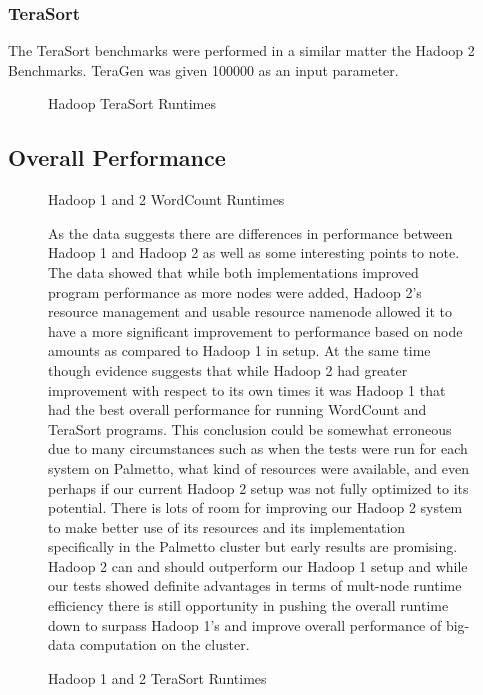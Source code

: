 \documentclass[conference]{IEEEtran}
\begin{document}
					\subsubsection{TeraSort}
						The TeraSort benchmarks were performed in a similar matter the Hadoop 2 Benchmarks. TeraGen was given 100000 as an input parameter.
						\begin{figure}[h]
                   					\begin{center}
                        						\caption{Hadoop TeraSort Runtimes}
                    				\end{center}
                  			\end{figure}
				\subsection{Overall Performance}
						\begin{figure}[h]
                   					\begin{center}
                       						
                        						\caption{Hadoop 1 and 2 WordCount Runtimes}
                    					\end{center}
						\end{figure}
						\begin{figure}[h]
                   					\begin{center}
                        					\caption{Hadoop 1 and 2 TeraSort Runtimes}
                    				\end{center}

						As the data suggests there are differences in performance between Hadoop 1 and Hadoop 2 as well as some interesting points to note. The data showed that while both implementations improved program performance as more nodes were added, Hadoop 2’s resource management and usable resource namenode allowed it to have a more significant improvement to performance based on node amounts as compared to Hadoop 1 in setup. At the same time though evidence suggests that while Hadoop 2 had greater improvement with respect to its own times it was Hadoop 1 that had the best overall performance for running WordCount and TeraSort programs. This conclusion could be somewhat erroneous due to many circumstances such as when the tests were run for each system on Palmetto, what kind of resources were available, and even perhaps if our current Hadoop 2 setup was not fully optimized to its potential. There is lots of room for improving our Hadoop 2 system to make better use of its resources and its implementation specifically in the Palmetto cluster but early results are promising. Hadoop 2 can and should outperform our Hadoop 1 setup and while our tests showed definite advantages in terms of mult-node runtime efficiency there is still opportunity in pushing the overall runtime down to surpass Hadoop 1’s and improve overall performance of big-data computation on the cluster.
                  			\end{figure}
\end{document}
